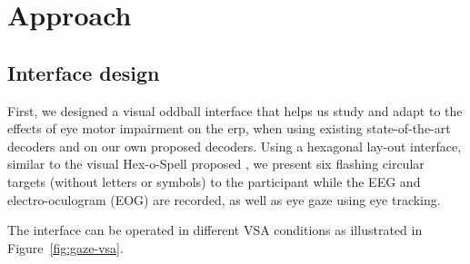 \section{Approach}

\subsection{Interface design}


First, we designed a visual oddball interface that helps us study and adapt
to the effects of eye motor impairment on the \ac{erp}, when using existing state-of-the-art
decoders and on our own proposed decoders.
Using a hexagonal lay-out interface, similar to the visual Hex-o-Spell proposed
\textcite{Treder2010}, we present six flashing circular targets
(without letters or symbols) to the participant while the EEG and
electro-oculogram (EOG) are recorded, as well as eye gaze using eye tracking.

The interface can be operated in different VSA conditions as illustrated in
Figure~\ref{fig:gaze-vsa}.

